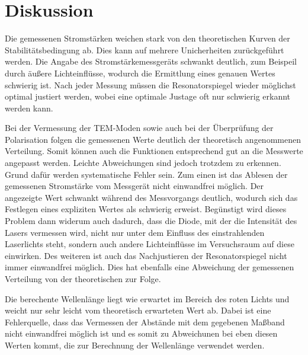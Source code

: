 \section{Diskussion}
\label{sec:Diskussion}
Die gemessenen Stromstärken weichen stark von den theoretischen Kurven der Stabilitätsbedingung ab. Dies kann auf
mehrere Unicherheiten zurückgeführt werden. Die Angabe des Stromstärkemessgeräts schwankt deutlich, zum Beispeil durch äußere Lichteinflüsse, wodurch
die Ermittlung eines genauen Wertes schwierig ist. Nach jeder Messung müssen die Resonatorspiegel wieder
möglichst optimal justiert werden, wobei eine optimale Justage oft nur schwierig erkannt werden kann.


Bei der Vermessung der TEM-Moden sowie auch bei der Überprüfung der Polarisation
folgen die gemessenen Werte deutlich der theoretisch angenommenen Verteilung. Somit
können auch die Funktionen entsprechend gut an die Messwerte angepasst werden.
Leichte Abweichungen sind jedoch trotzdem zu erkennen. Grund dafür werden systematische
Fehler sein. Zum einen ist das Ablesen der gemessenen Stromstärke vom Messgerät nicht
einwandfrei möglich. Der angezeigte Wert schwankt während des Messvorgangs deutlich,
wodurch sich das Festlegen eines expliziten Wertes als schwierig erweist. Begünstigt wird
dieses Problem dann widerum auch dadurch, dass die Diode, mit der die Intensität des Lasers
vermessen wird, nicht nur unter dem Einfluss des einstrahlenden Laserlichts steht, sondern
auch andere Lichteinflüsse im Versuchsraum auf diese einwirken. Des weiteren ist auch
das Nachjustieren der Resonatorspiegel nicht immer einwandfrei möglich. Dies hat ebenfalls
eine Abweichung der gemessenen Verteilung von der theoretischen zur Folge.

Die berechente Wellenlänge liegt wie erwartet im Bereich des roten Lichts und weicht
nur sehr leicht vom theoretisch erwarteten Wert ab. Dabei ist eine Fehlerquelle,
dass das Vermessen der Abstände mit dem gegebenen Maßband nicht einwandfrei
möglich ist und es somit zu Abweichunen bei eben diesen Werten kommt, die zur Berechnung
der Wellenlänge verwendet werden.
